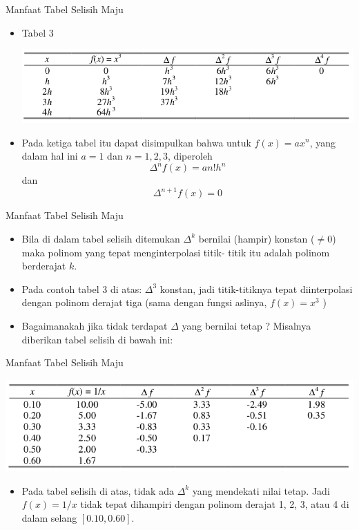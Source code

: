 \documentclass[pdflatex,compress,mathserif]{beamer}
\begin{document}
\begin{frame}{Manfaat Tabel Selisih Maju}
	\begin{itemize}
		\item Tabel 3
		\begin{center}
			\includegraphics[width=0.7\linewidth]{img/img23}
		\end{center}
		\item Pada ketiga tabel itu dapat disimpulkan bahwa untuk $ f(x) = ax^n $, yang dalam hal ini $ a = 1 $ dan $ n = 1, 2, 3 $, diperoleh
		\[ \Delta^n f(x) = a n! h^n \] dan \[ \Delta^{n+1} f(x) = 0 \]
	\end{itemize}
\end{frame}

\begin{frame}{Manfaat Tabel Selisih Maju}
	\begin{itemize}
		\item Bila di dalam tabel selisih ditemukan $ \Delta^k $ bernilai (hampir) konstan ($\neq 0$) maka polinom yang tepat menginterpolasi titik- titik itu adalah polinom berderajat $ k $.
		\item Pada contoh tabel 3 di atas: $ \Delta^3 $ konstan, jadi titik-titiknya tepat diinterpolasi dengan polinom derajat tiga (sama dengan fungsi aslinya, $ f(x) = x^3 $ )
		\item Bagaimanakah jika tidak terdapat $\Delta$ yang bernilai tetap ? Misalnya diberikan tabel selisih di bawah ini:
	\end{itemize}
\end{frame}

\begin{frame}{Manfaat Tabel Selisih Maju}
	\begin{center}
		\includegraphics[width=0.7\linewidth]{img/img24}
	\end{center}
	\begin{itemize}
		\item Pada tabel selisih di atas, tidak ada $\Delta^k$ yang mendekati nilai tetap. Jadi $ f(x) = 1/x $ tidak tepat dihampiri dengan polinom derajat 1, 2, 3, atau 4 di dalam selang $ [0.10, 0.60] $.
	\end{itemize}
\end{frame}
\end{document}
